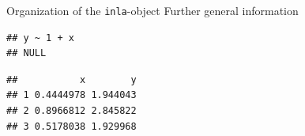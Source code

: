 \documentclass[
  ignorenonframetext,
]{beamer}
\newenvironment{Shaded}{\begin{snugshade}}{\end{snugshade}}
\newcommand{\CommentTok}[1]{\textcolor[rgb]{0.56,0.35,0.01}{\textit{#1}}}
\newcommand{\DecValTok}[1]{\textcolor[rgb]{0.00,0.00,0.81}{#1}}
\newcommand{\NormalTok}[1]{#1}
\newcommand{\SpecialCharTok}[1]{\textcolor[rgb]{0.00,0.00,0.00}{#1}}
\begin{document}
\begin{frame}[fragile]{Organization of the \texttt{inla}-object}
\protect\hypertarget{organization-of-the-inla-object-3}{}
Further general information

\begin{Shaded}
\end{Shaded}

\begin{verbatim}
## y ~ 1 + x
## NULL
\end{verbatim}

\begin{Shaded}
\end{Shaded}

\begin{verbatim}
##           x        y
## 1 0.4444978 1.944043
## 2 0.8966812 2.845822
## 3 0.5178038 1.929968
\end{verbatim}

\begin{Shaded}
\end{Shaded}
\end{frame}
\end{document}

